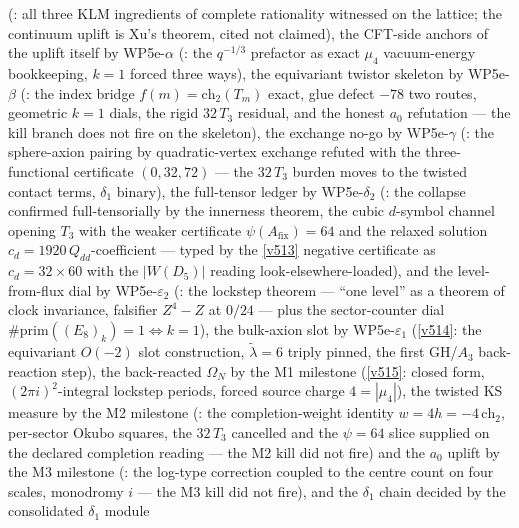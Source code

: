 \documentclass[11pt,a4paper]{article}
\begin{document}
(: all three KLM ingredients of complete
rationality witnessed on the lattice; the continuum uplift is Xu's theorem, cited not claimed),
the CFT-side anchors of the uplift itself by WP5e-$\alpha$
(: the $q^{-1/3}$ prefactor as exact $\mu_4$
vacuum-energy bookkeeping, $k=1$ forced three ways), the equivariant twistor skeleton by
WP5e-$\beta$ (: the index bridge
$f(m)=\mathrm{ch}_2(T_m)$ exact, glue defect $-78$ two routes, geometric $k=1$ dials, the rigid
$32\,T_3$ residual, and the honest $a_0$ refutation --- the kill branch does not fire on the
skeleton), the exchange no-go by WP5e-$\gamma$
(: the sphere-axion pairing by quadratic-vertex
exchange refuted with the three-functional certificate $(0,32,72)$ --- the $32\,T_3$ burden moves
to the twisted contact terms, $\delta_1$ binary), the full-tensor ledger by WP5e-$\delta_2$
(: the collapse confirmed full-tensorially
by the innerness theorem, the cubic $d$-symbol channel opening $T_3$ with the weaker certificate
$\psi(A_{\mathrm{fix}})=64$ and the relaxed solution $c_d=1920\,Q_{dd}$-coefficient --- typed by
the \vref{v513} negative certificate as $c_d=32\times60$ with the $|W(D_5)|$ reading
look-elsewhere-loaded), and the
level-from-flux dial by
WP5e-$\varepsilon_2$ (: the lockstep
theorem --- ``one level'' as a theorem of clock invariance, falsifier $Z^4{-}Z$ at $0/24$ ---
plus the sector-counter dial $\#\mathrm{prim}((E_8)_k)=1\Leftrightarrow k=1$), the bulk-axion
slot by WP5e-$\varepsilon_1$ (\vref{v514}: the equivariant $O(-2)$ slot construction,
$\tilde\lambda=6$ triply pinned, the first GH/$A_3$ back-reaction step), the back-reacted
$\Omega_N$ by the M1 milestone (\vref{v515}: closed form, $(2\pi i)^2$-integral lockstep
periods, forced source charge $4=|\mu_4|$), the twisted KS measure by the M2 milestone
(: the completion-weight identity
$w=4h=-4\,\mathrm{ch}_2$, per-sector Okubo squares, the $32\,T_3$ cancelled and the $\psi=64$
slice supplied on the declared completion reading --- the M2 kill did not fire) and the $a_0$
uplift by the M3 milestone (: the log-type
correction coupled to the centre count on four scales, monodromy $i$ --- the M3 kill did not
fire), and the $\delta_1$ chain decided by the consolidated $\delta_1$ module
\end{document}

